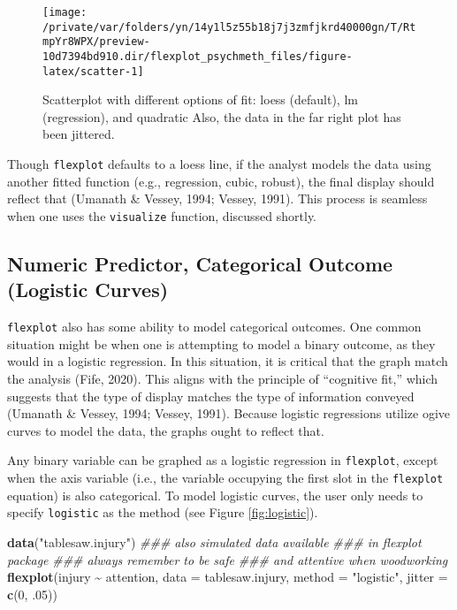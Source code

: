 \documentclass[
  english,
  man]{apa6}
\newenvironment{Shaded}{\begin{snugshade}}{\end{snugshade}}
\newcommand{\CommentTok}[1]{\textcolor[rgb]{0.56,0.35,0.01}{\textit{#1}}}
\newcommand{\DataTypeTok}[1]{\textcolor[rgb]{0.13,0.29,0.53}{#1}}
\newcommand{\DecValTok}[1]{\textcolor[rgb]{0.00,0.00,0.81}{#1}}
\newcommand{\FloatTok}[1]{\textcolor[rgb]{0.00,0.00,0.81}{#1}}
\newcommand{\KeywordTok}[1]{\textcolor[rgb]{0.13,0.29,0.53}{\textbf{#1}}}
\newcommand{\NormalTok}[1]{#1}
\newcommand{\OperatorTok}[1]{\textcolor[rgb]{0.81,0.36,0.00}{\textbf{#1}}}
\newcommand{\StringTok}[1]{\textcolor[rgb]{0.31,0.60,0.02}{#1}}
\begin{document}
\begin{figure}

{\centering \texttt{[image: /private/var/folders/yn/14y1l5z55b18j7j3zmfjkrd40000gn/T/RtmpYr8WPX/preview-10d7394bd910.dir/flexplot\_psychmeth\_files/figure-latex/scatter-1]} 

}

\caption{Scatterplot with different options of fit: loess (default), lm (regression), and quadratic Also, the data in the far right plot has been jittered. }\label{fig:scatter}
\end{figure}

\normalsize

Though \texttt{flexplot} defaults to a loess line, if the analyst models the data using another fitted function (e.g., regression, cubic, robust), the final display should reflect that (Umanath \& Vessey, 1994; Vessey, 1991). This process is seamless when one uses the \texttt{visualize} function, discussed shortly.

\hypertarget{numeric-predictor-categorical-outcome-logistic-curves}{%
\subsection{Numeric Predictor, Categorical Outcome (Logistic Curves)}\label{numeric-predictor-categorical-outcome-logistic-curves}}

\texttt{flexplot} also has some ability to model categorical outcomes. One common situation might be when one is attempting to model a binary outcome, as they would in a logistic regression. In this situation, it is critical that the graph match the analysis (Fife, 2020). This aligns with the principle of ``cognitive fit,'' which suggests that the type of display matches the type of information conveyed (Umanath \& Vessey, 1994; Vessey, 1991). Because logistic regressions utilize ogive curves to model the data, the graphs ought to reflect that.

Any binary variable can be graphed as a logistic regression in \texttt{flexplot}, except when the axis variable (i.e., the variable occupying the first slot in the \texttt{flexplot} equation) is also categorical. To model logistic curves, the user only needs to specify \texttt{logistic} as the method (see Figure \ref{fig:logistic}).

\small

\begin{Shaded}
\begin{Highlighting}[]
\KeywordTok{data}\NormalTok{(}\StringTok{"tablesaw.injury"}\NormalTok{) }\CommentTok{\#\#\# also simulated data available }
                        \CommentTok{\#\#\# in flexplot package}
                        \CommentTok{\#\#\# always remember to be safe }
                        \CommentTok{\#\#\# and attentive when woodworking}
\KeywordTok{flexplot}\NormalTok{(injury }\OperatorTok{\textasciitilde{}}\StringTok{ }\NormalTok{attention, }\DataTypeTok{data =}\NormalTok{ tablesaw.injury, }
             \DataTypeTok{method =} \StringTok{"logistic"}\NormalTok{, }\DataTypeTok{jitter =} \KeywordTok{c}\NormalTok{(}\DecValTok{0}\NormalTok{, }\FloatTok{.05}\NormalTok{))}
\end{Highlighting}
\end{Shaded}
\end{document}
